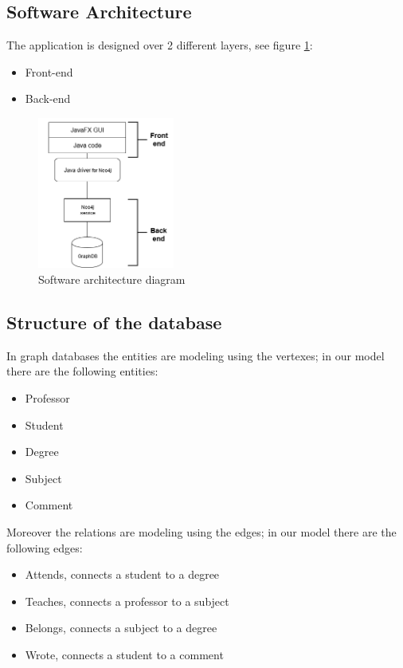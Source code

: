 \documentclass[a4paper]{article}
\begin{document}
\subsection{Software Architecture}
The application is designed over 2 different layers, see figure \ref{fig:architecture_diagram}:
\begin{itemize}
\item Front-end
\item Back-end
\end{itemize}
\begin{figure}[h]
\centering
\includegraphics[width=0.4\textwidth]{./images/diagrams/architecture_diagram.png} 
\caption{Software architecture diagram\\}
\label{fig:architecture_diagram}
\end{figure}

\subsection{Structure of the database}
In graph databases the entities are modeling using the vertexes; in our model there are the following entities:
\begin{itemize}
\item Professor
\item Student
\item Degree
\item Subject
\item Comment
\end{itemize}
Moreover the relations are modeling using the edges; in our model there are the following edges:
\begin{itemize}
\item Attends, connects a student to a degree
\item Teaches, connects a professor to a subject
\item Belongs, connects a subject to a degree
\item Wrote, connects a student to a comment
\end{itemize}
\end{document}
